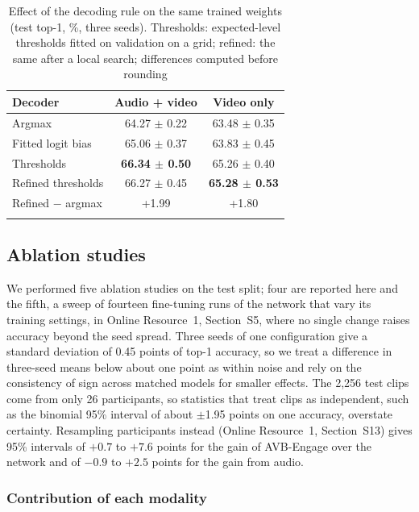 \documentclass[pdflatex,iicol,sn-basic]{sn-jnl}
\newcommand{\ournet}{AVB-Engage}
\begin{document}
\begin{table}[t]
\caption{Effect of the decoding rule on the same trained weights (test top-1, \%, three seeds). Thresholds: expected-level thresholds fitted on validation on a grid; refined: the same after a local search; differences computed before rounding}\label{tab:decoder}
\begin{tabular*}{\columnwidth}{@{\extracolsep\fill}lcc}
\toprule
Decoder & Audio + video & Video only\\
\midrule
Argmax & 64.27 $\pm$ 0.22 & 63.48 $\pm$ 0.35\\
Fitted logit bias & 65.06 $\pm$ 0.37 & 63.83 $\pm$ 0.45\\
Thresholds & \textbf{66.34 $\pm$ 0.50} & 65.26 $\pm$ 0.40\\
Refined thresholds & 66.27 $\pm$ 0.45 & \textbf{65.28 $\pm$ 0.53}\\
\midrule
Refined $-$ argmax & +1.99 & +1.80\\
\botrule
\end{tabular*}
\end{table}

\subsection{Ablation studies}\label{sec:ablation}

We performed five ablation studies on the test split; four are reported here and the fifth, a sweep of fourteen fine-tuning runs of the network that vary its training settings, in Online Resource~1, Section~S5, where no single change raises accuracy beyond the seed spread. Three seeds of one configuration give a standard deviation of 0.45 points of top-1 accuracy, so we treat a difference in three-seed means below about one point as within noise and rely on the consistency of sign across matched models for smaller effects. The 2,256 test clips come from only 26 participants, so statistics that treat clips as independent, such as the binomial 95\% interval of about $\pm$1.95 points on one accuracy, overstate certainty. Resampling participants instead (Online Resource~1, Section~S13) gives 95\% intervals of $+0.7$ to $+7.6$ points for the gain of \ournet{} over the network and of $-0.9$ to $+2.5$ points for the gain from audio.

\subsubsection{Contribution of each modality}\label{sec:abl_modality}
\end{document}
